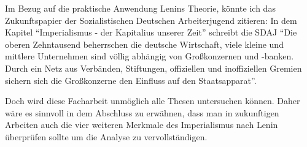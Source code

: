 \documentclass[a4paper]{article}
\begin{document}
    Im Bezug auf die praktische Anwendung Lenins Theorie, könnte ich das Zukunftspapier der Sozialistischen Deutschen Arbeiterjugend zitieren: In dem Kapitel ``Imperialismus - der Kapitalius unserer Zeit'' schreibt die SDAJ ``Die oberen Zehntausend beherrschen die deutsche Wirtschaft, viele kleine und mittlere Unternehmen sind völlig abhängig von Großkonzernen und -banken. Durch ein Netz aus Verbänden, Stiftungen, offiziellen und inoffiziellen Gremien sichern sich die Großkonzerne den Einfluss auf den Staatsapparat''.

    Doch wird diese Facharbeit unmöglich alle Thesen untersuchen können. Daher wäre es sinnvoll in dem Abschluss zu erwähnen, dass man in zukunftigen Arbeiten auch die vier weiteren Merkmale des Imperialismus nach Lenin überprüfen sollte um die Analyse zu vervollständigen. 
    

    
\end{document}
